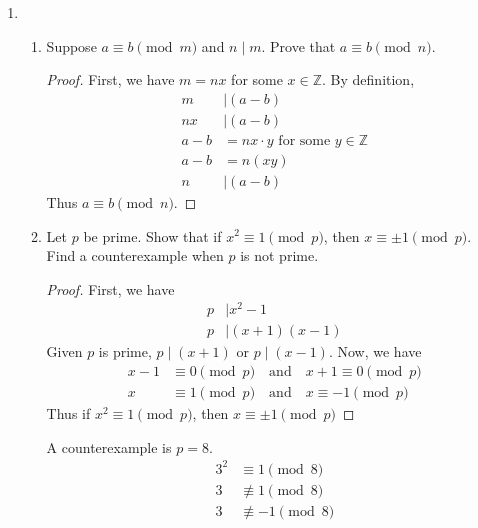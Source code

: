 \documentclass[11pt]{article}
\begin{document}
\begin{enumerate}
    \item 
    \begin{enumerate}
        \item Suppose $a\equiv b\pmod m$ and $n\mid m$. Prove that $a\equiv b\pmod n$.
        \begin{proof}
            First, we have $m=nx$ for some $x\in\mathbb{Z}$. By definition,
            \begin{align*}
                m &\mid (a-b) \\
                nx &\mid (a-b) \\
                a-b &= nx\cdot y \text{ for some } y\in\mathbb{Z} \\
                a-b &= n(xy) \\
                n &\mid (a-b)
            \end{align*}
            Thus $a\equiv b\pmod n$.
        \end{proof}

        \item Let $p$ be prime. Show that if $x^2\equiv 1\pmod p$, then $x\equiv \pm 1\pmod p$. Find a counterexample when $p$ is not prime.
        \begin{proof}
            First, we have
            \begin{align*}
                p &\mid x^2-1 \\
                p &\mid (x+1)(x-1) 
            \end{align*}
            Given $p$ is prime, $p\mid(x+1)$ or $p\mid(x-1)$. Now, we have
            \begin{align*}
                x-1&\equiv 0\pmod{p} \quad\text{and}\quad x+1\equiv 0\pmod{p} \\
                x&\equiv 1\pmod{p} \quad\text{and}\quad x\equiv -1\pmod{p}
            \end{align*}
            Thus if $x^2\equiv 1\pmod{p}$, then $x\equiv\pm 1\pmod{p}$
        \end{proof}
        A counterexample is $p=8$.
        \begin{align*}
            3^2 &\equiv 1 \pmod{8} \\
            3 &\not\equiv 1 \pmod{8} \\
            3 &\not\equiv -1 \pmod{8}
        \end{align*}


\end{enumerate}
\end{enumerate}
\end{document}

